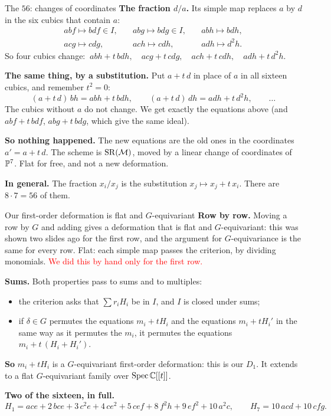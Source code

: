 \begin{frame}{The \(56\): changes of coordinates}
\textbf{The fraction \(d/a\).} Its simple map replaces \(a\) by \(d\) in the six cubics that contain \(a\):
\[
\begin{array}{llll}
abf\mapsto bdf\in I,&\quad abg\mapsto bdg\in I,&\quad abh\mapsto bdh,\\[2pt]
acg\mapsto cdg,&\quad ach\mapsto cdh,&\quad adh\mapsto d^2h.
\end{array}
\]
So four cubics change: \(\ abh+t\,bdh,\quad acg+t\,cdg,\quad ach+t\,cdh,\quad adh+t\,d^2h\).
\par
\textbf{The same thing, by a substitution.} Put \(a+t\,d\) in place of \(a\) in all sixteen cubics, and remember \(t^2=0\):
\[
(a+t\,d)\,bh=abh+t\,bdh,\qquad(a+t\,d)\,dh=adh+t\,d^2h,\qquad\dots
\]
The cubics without \(a\) do not change. We get exactly the equations above (and \(abf+t\,bdf\), \(abg+t\,bdg\), which give the same ideal).
\par
\textbf{So nothing happened.} The new equations are the old ones in the coordinates \(a'=a+t\,d\). The scheme is \(\operatorname{SR}(\mathcal M)\), moved by a linear change of coordinates of \(\mathbb P^7\). Flat for free, and not a new deformation.
\par
\textbf{In general.} The fraction \(x_i/x_j\) is the substitution \(x_j\mapsto x_j+t\,x_i\). There are \(8\cdot7=56\) of them.
\end{frame}

\begin{frame}{Our first-order deformation is flat and \(G\)-equivariant}
\textbf{Row by row.} Moving a row by \(G\) and adding gives a deformation that is flat and \(G\)-equivariant: this was shown two slides ago for the first row, and the argument for \(G\)-equivariance is the same for every row. Flat: each simple map passes the criterion, by dividing monomials. \textcolor{red}{We did this by hand only for the first row.}
\par\medskip
\textbf{Sums.} Both properties pass to sums and to multiples:
\begin{itemize}
\setlength{\itemsep}{2pt}
\item the criterion asks that \(\sum r_iH_i\) be in \(I\), and \(I\) is closed under sums;
\item if \(\delta\in G\) permutes the equations \(m_i+tH_i\) and the equations \(m_i+tH_i'\) in the same way as it permutes the \(m_i\), it permutes the equations \(m_i+t\,(H_i+H_i')\).
\end{itemize}
\textbf{So} \(m_i+tH_i\) is a \(G\)-equivariant first-order deformation: this is our \(D_1\). It extends to a flat \(G\)-equivariant family over \(\operatorname{Spec}\mathbb C[[t]]\).
\par\medskip
\textbf{Two of the sixteen, in full.}
\[
H_1=ace+2\,bce+3\,c^2e+4\,ce^2+5\,cef+8\,f^2h+9\,ef^2+10\,a^2c,\qquad H_7=10\,acd+10\,cfg.
\]
\end{frame}

